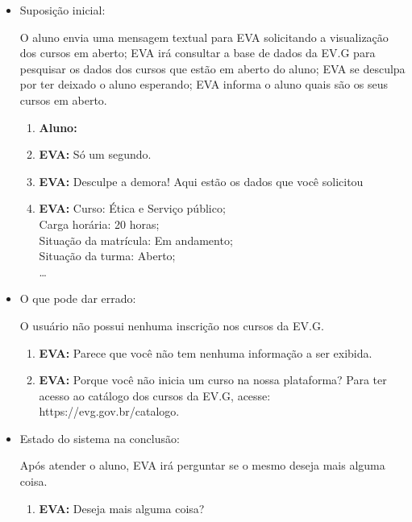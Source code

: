 \begin{itemize}
    \item Suposição inicial:
    
        O aluno envia uma mensagem textual para EVA solicitando a visualização dos cursos em aberto; EVA irá consultar a base de dados da EV.G para pesquisar os dados dos cursos que estão em aberto do aluno; EVA se desculpa por ter deixado o aluno esperando; EVA informa o aluno quais são os seus cursos em aberto.
        
        \begin{enumerate}
            \item \textbf{Aluno:}
            \item \textbf{EVA:} Só um segundo.
            \item \textbf{EVA:} Desculpe a demora! Aqui estão os dados que você solicitou
            \item \textbf{EVA:} Curso: Ética e Serviço público; \\
            Carga horária: 20 horas; \\
            Situação da matrícula: Em andamento; \\
            Situação da turma: Aberto;\\ \ldots
        \end{enumerate}
    
    \item O que pode dar errado:
    
    O usuário não possui nenhuma inscrição nos cursos da EV.G.
    
        \begin{enumerate}
            \item \textbf{EVA:} Parece que você não tem nenhuma informação a ser exibida.
            \item \textbf{EVA:} Porque você não inicia um curso na nossa plataforma? Para ter acesso ao catálogo dos cursos da EV.G, acesse: https://evg.gov.br/catalogo.
        \end{enumerate}
    
    \item Estado do sistema na conclusão:
    
        Após atender o aluno, EVA irá perguntar se o mesmo deseja mais alguma coisa.
        
        \begin{enumerate}
            \item \textbf{EVA:} Deseja mais alguma coisa?
        \end{enumerate}
    
\end{itemize}

